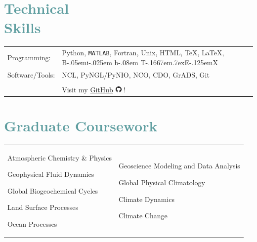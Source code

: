 \documentclass[margin,line,palatino,courier,10pt]{res}
\def\BibTeX{{\rm B\kern-.05em{\sc i\kern-.025em b}\kern-.08em
    T\kern-.1667em\lower.7ex\hbox{E}\kern-.125emX}}
\newenvironment{list1}{
  \begin{list}{\ding{113}}{%
      \setlength{\itemsep}{0in}
      \setlength{\parsep}{0in} \setlength{\parskip}{0in}
      \setlength{\topsep}{0in} \setlength{\partopsep}{0in}
      \setlength{\leftmargin}{0.17in}}}{\end{list}}
\begin{document}
\begin{resume}
\section{\sc \textcolor{CadetBlue}{\large{Technical \\ Skills}}}
\vspace*{0.05in}
\begin{tabular}{@{}p{0.8in}p{6in}}

Programming:& Python, \texttt{MATLAB}, Fortran, Unix, HTML, \TeX, \LaTeX, \BibTeX \\
Software/Tools: & NCL, PyNGL/PyNIO, NCO, CDO, GrADS, Git\\\\

& Visit my \href{https://github.com/zmlabe}{GitHub} \includegraphics[height=9pt]{github.png} !\\
\end{tabular}


\noindent\makebox[\linewidth][r]{\rule{\textwidth}{5pt}}
\section{\sc \textcolor{CadetBlue}{\large{Graduate Coursework}}}
\vspace{-0.1in}
\begin{tabular}{@{}p{2.2in}p{3in}}
\begin{list1}
\item Atmospheric Chemistry \& Physics 
\item Geophysical Fluid Dynamics
\item Global Biogeochemical Cycles
\item Land Surface Processes
\item Ocean Processes
\end{list1}
&
\begin{list1}
\item Geoscience Modeling and Data Analysis
\item Global Physical Climatology
\item Climate Dynamics
\item Climate Change
\end{list1}
\end{tabular}


\end{resume}
\end{document}
